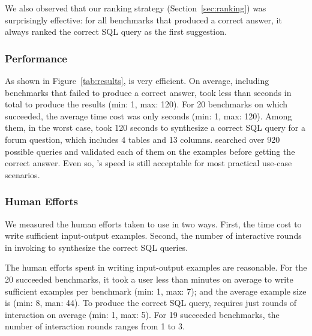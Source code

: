 We also observed that our ranking strategy (Section~\ref{sec:ranking})
was surprisingly effective: for all benchmarks that
\ourtool produced a correct answer, it always ranked the correct
SQL query as the first suggestion.

%

\subsubsection{Performance}
\label{sec:performance}

As shown in Figure~\ref{tab:results}, \ourtool
is very efficient.
On average,
including benchmarks that \ourtool failed to produce
a correct answer,
\ourtool took less than \avgtime seconds in total to
produce the results (min: 1, max: 120).
For 20 benchmarks on which \ourtool succeeded, the average
time cost was only \avgsucctime seconds (min: 1, max: 120). 
Among them, in the worst case, \ourtool took 120 seconds to synthesize a
correct SQL query for a forum question, which includes 4 tables
and 13 columns. \ourtool searched over 920 possible
queries and validated each of them on the examples before getting
the correct answer. Even so, \ourtool's speed is still acceptable
for most practical use-case scenarios.






\subsubsection{Human Efforts}
\label{sec:human}

We measured the human efforts taken to use \ourtool in two ways.
First, the time cost to write sufficient input-output examples. Second,
the number of interactive rounds in invoking \ourtool
to synthesize the correct SQL queries.

The human efforts spent in writing
input-output examples are reasonable. For
the 20 succeeded benchmarks, it took a user less than
\avgsucchum minutes on average to write sufficient examples
per benchmark (min: 1, max: 7); and the
average example size is \avgsucctuple
(min: 8, man: 44).
To produce the correct SQL query,
\ourtool requires just \avgsuccround rounds of
interaction on average (min: 1, max: 5).
For 19 succeeded benchmarks, the number of interaction
rounds ranges from 1 to 3.

